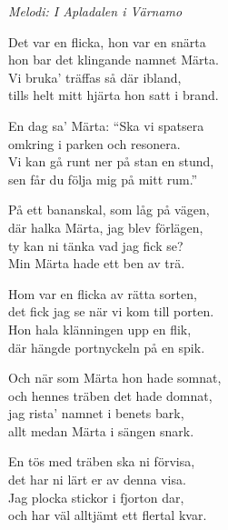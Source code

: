 {\footnotesize\textit{Melodi: I Apladalen i Värnamo}}\par
\vspace{10pt}
Det var en flicka, hon var en snärta\\
hon bar det klingande namnet Märta.\\
Vi bruka' träffas så där ibland,\\
tills helt mitt hjärta hon satt i brand.\par
\vspace{10pt}
En dag sa' Märta: ``Ska vi spatsera\\
omkring i parken och resonera.\\
Vi kan gå runt ner på stan en stund,\\
sen får du följa mig på mitt rum.''\par
\vspace{10pt}
På ett bananskal, som låg på vägen,\\
där halka Märta, jag blev förlägen,\\
ty kan ni tänka vad jag fick se?\\
Min Märta hade ett ben av trä.\par
\vspace{10pt}
Hom var en flicka av rätta sorten,\\
det fick jag se när vi kom till porten.\\
Hon hala klänningen upp en flik,\\
där hängde portnyckeln på en spik.\par
\vspace{10pt}
Och när som Märta hon hade somnat,\\
och hennes träben det hade domnat,\\
jag rista' namnet i benets bark,\\
allt medan Märta i sängen snark.\par
\vspace{10pt}
En tös med träben ska ni förvisa,\\
det har ni lärt er av denna visa.\\
Jag plocka stickor i fjorton dar,\\
och har väl alltjämt ett flertal kvar.
